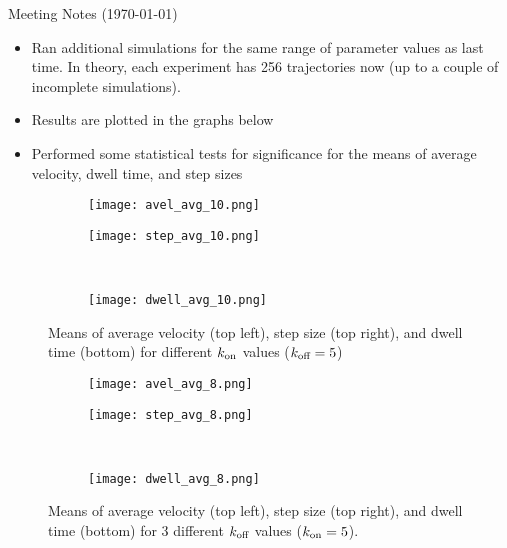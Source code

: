 \documentclass{article}
\newcommand{\tn}{\textnormal}
\begin{document}
\pagestyle{plain}

\begin{center}
  {\Large Meeting Notes (\today)}
\end{center}

\begin{itemize}
\item Ran additional simulations for the same range of parameter
  values as last time. In theory, each experiment has 256 trajectories
  now (up to a couple of incomplete simulations). 
\item Results are plotted in the graphs below
\item Performed some statistical tests for significance for the
  means of average velocity, dwell time, and step sizes
\end{itemize}

\begin{figure}[h]
  \centering
  \begin{subfigure}{0.49\textwidth}
    \texttt{[image: avel\_avg\_10.png]}
  \end{subfigure}
  \hfill
  \begin{subfigure}{0.49\textwidth}
    \texttt{[image: step\_avg\_10.png]}
  \end{subfigure}
  \\
  \begin{subfigure}{0.49\textwidth}
    \texttt{[image: dwell\_avg\_10.png]}
  \end{subfigure}
  \label{fig:stats10}
  \caption{Means of average velocity (top left), step size (top
    right), and dwell time (bottom) for different $k_\tn{on}$
    values ($k_\tn{off} = 5$)}
\end{figure}

\begin{figure}[h]
  \centering
  \begin{subfigure}{0.49\textwidth}
    \texttt{[image: avel\_avg\_8.png]}
  \end{subfigure}
  \hfill
  \begin{subfigure}{0.49\textwidth}
    \texttt{[image: step\_avg\_8.png]}
  \end{subfigure}
  \\
  \begin{subfigure}{0.49\textwidth}
    \texttt{[image: dwell\_avg\_8.png]}
  \end{subfigure}
  \label{fig:stats8}
  \caption{Means of average velocity (top left), step size (top
    right), and dwell time (bottom) for 3 different $k_\tn{off}$
    values ($k_\tn{on} = 5$).}
\end{figure}
\end{document}
